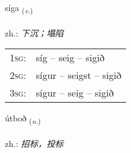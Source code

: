 \documentclass[frontgrid, backgrid]{flacards}\usepackage[]{graphicx}\usepackage[]{xcolor}
\begin{document}
\renewcommand{\flhead}{\vskip5pt \fboxsep=0pt {\small\bfseries\footnotesize Sagnorð | 动词}}
\renewcommand{\fcfoot}{\vskip5pt \fboxsep=0pt \hspace{2pt}{\small\bfseries\footnotesize 3K}}

\renewcommand{\blhead}{\vskip5pt {\small\bfseries\footnotesize Sagnorð | 动词 }}
\renewcommand{\bcfoot}{\vskip5pt \hspace{2pt}{\small\bfseries\footnotesize 3K}}


{síga \small{\textsubscript{(\textit{v.})}} \\[1ex] %
\textphonetic{[siːɣa]} \\
zh.: \emph{下沉；塌陷} \\  [2ex]
\renewcommand*{\arraystretch}{0.8}
\begin{tabular}{p{1cm}l}
\textsc{1sg}: & síg -- seig -- sigið \\ 
\textsc{2sg}: & sígur -- seigst -- sigið \\ 
\textsc{3sg}: & sígur -- seig -- sigið \\ 
\end{tabular}
}

\renewcommand{\flhead}{\vskip5pt \fboxsep=0pt {\small\bfseries\footnotesize Nafnorð | 名词}}
\renewcommand{\fcfoot}{\vskip5pt \fboxsep=0pt \hspace{2pt}{\small\bfseries\footnotesize 3K}}

\renewcommand{\blhead}{\vskip5pt {\small\bfseries\footnotesize Nafnorð | 名词 }}
\renewcommand{\bcfoot}{\vskip5pt \hspace{2pt}{\small\bfseries\footnotesize 3K}}


{útboð \small{\textsubscript{(\textit{n.})}} \\[1ex] %
\textphonetic{[uːtpɔð]} \\
zh.: \emph{招标，投标} \\  [2ex]
\renewcommand*{\arraystretch}{0.8}
}
\end{document}
